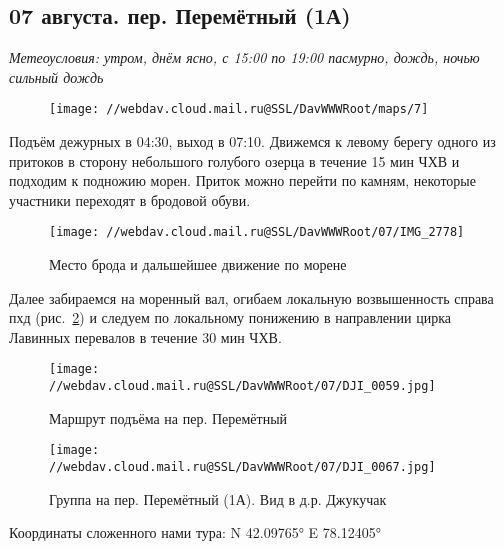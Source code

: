 \subsection{07 августа. пер. Перемётный (1А)}
\textit{Метеоусловия: утром, днём ясно, с 15:00 по 19:00 пасмурно, дождь, ночью сильный дождь}

\begin{figure}[h!]
	\centering
	\texttt{[image: //webdav.cloud.mail.ru@SSL/DavWWWRoot/maps/7]}
	\label{fig:mini_18}
\end{figure}

Подъём дежурных в 04:30, выход в 07:10. Движемся к левому берегу одного из притоков в сторону небольшого голубого озерца в течение 15 мин ЧХВ и подходим к подножию морен. Приток можно перейти по камням, некоторые участники переходят в бродовой обуви.

\begin{figure}[h!]
	\centering
	\texttt{[image: //webdav.cloud.mail.ru@SSL/DavWWWRoot/07/IMG\_2778]}
	\caption{Место брода и дальшейшее движение по морене}
	\label{fig:img2778}
\end{figure}

Далее забираемся на моренный вал, огибаем локальную возвышенность справа пхд (рис.~\ref{fig:img2778}) и следуем по локальному понижению в направлении цирка Лавинных перевалов в течение 30 мин ЧХВ.
\begin{figure}[h!]
	\centering
	\texttt{[image: //webdav.cloud.mail.ru@SSL/DavWWWRoot/07/DJI\_0059.jpg]}
	\caption{Маршрут подъёма на пер. Перемётный}
	\label{fig:DJI_0059.jpg}
\end{figure}

\begin{figure}[h!]
	\centering
	\texttt{[image: //webdav.cloud.mail.ru@SSL/DavWWWRoot/07/DJI\_0067.jpg]}
	\caption{Группа на пер. Перемётный (1А). Вид в д.р. Джукучак}
	\label{fig:DJI_0067.jpg}
\end{figure}

Координаты сложенного нами тура: N 42.09765° E 78.12405°

\clearpage